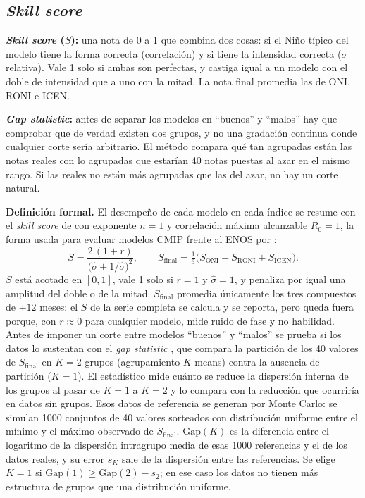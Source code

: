 \documentclass[11pt,a4paper]{article}
\begin{document}
\subsection{\emph{Skill score}}
\label{sec:skill}

\begin{basico}
\textbf{\emph{Skill score} ($S$):} una nota de 0 a 1 que combina dos cosas: si el Niño típico del modelo tiene la forma correcta (correlación) y si tiene la intensidad correcta ($\sigma$ relativa). Vale 1 solo si ambas son perfectas, y castiga igual a un modelo con el doble de intensidad que a uno con la mitad. La nota final promedia las de ONI, RONI e ICEN.

\textbf{\emph{Gap statistic}:} antes de separar los modelos en ``buenos'' y ``malos'' hay que comprobar que de verdad existen dos grupos, y no una gradación continua donde cualquier corte sería arbitrario. El método compara qué tan agrupadas están las notas reales con lo agrupadas que estarían 40 notas puestas al azar en el mismo rango. Si las reales no están más agrupadas que las del azar, no hay un corte natural.
\end{basico}

\noindent\textbf{Definición formal.} El desempeño de cada modelo en cada índice se resume con el \emph{skill score} de \citet{taylor2001} con exponente $n=1$ y correlación máxima alcanzable $R_0=1$, la forma usada para evaluar modelos CMIP frente al ENOS por \citet[ec.~3]{kaur2021}:
\begin{equation}
\label{eq:skill}
S = \frac{2\,(1+r)}{\big(\hat\sigma + 1/\hat\sigma\big)^2}, \qquad S_{\mathrm{final}} = \tfrac{1}{3}\big(S_{\mathrm{ONI}} + S_{\mathrm{RONI}} + S_{\mathrm{ICEN}}\big).
\end{equation}
$S$ está acotado en $[0,1]$, vale 1 solo si $r=1$ y $\hat\sigma=1$, y penaliza por igual una amplitud del doble o de la mitad. $S_{\mathrm{final}}$ promedia únicamente los tres compuestos de $\pm12$ meses: el $S$ de la serie completa se calcula y se reporta, pero queda fuera porque, con $r\approx0$ para cualquier modelo, mide ruido de fase y no habilidad. Antes de imponer un corte entre modelos ``buenos'' y ``malos'' se prueba si los datos lo sustentan con el \emph{gap statistic} \citep{tibshirani2001}, que compara la partición de los 40 valores de $S_{\mathrm{final}}$ en $K=2$ grupos (agrupamiento $K$-means) contra la ausencia de partición ($K=1$). El estadístico mide cuánto se reduce la dispersión interna de los grupos al pasar de $K=1$ a $K=2$ y lo compara con la reducción que ocurriría en datos sin grupos. Esos datos de referencia se generan por Monte Carlo: se simulan 1000 conjuntos de 40 valores sorteados con distribución uniforme entre el mínimo y el máximo observado de $S_{\mathrm{final}}$. $\mathrm{Gap}(K)$ es la diferencia entre el logaritmo de la dispersión intragrupo media de esas 1000 referencias y el de los datos reales, y su error $s_K$ sale de la dispersión entre las referencias. Se elige $K=1$ si $\mathrm{Gap}(1) \geq \mathrm{Gap}(2) - s_2$; en ese caso los datos no tienen más estructura de grupos que una distribución uniforme.
\end{document}
